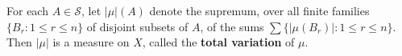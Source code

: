 For each $A \in \mathcal{S}$, let $|\mu|(A)$ denote the supremum, over all finite families $\{B_r : 1 \leq r \leq n\}$ of disjoint subsets of $A$, of the sums $\sum \{|\mu(B_r)| : 1 \leq r \leq n\}$. Then $|\mu|$ is a measure on $X$, called the \textbf{total variation} of $\mu$.
